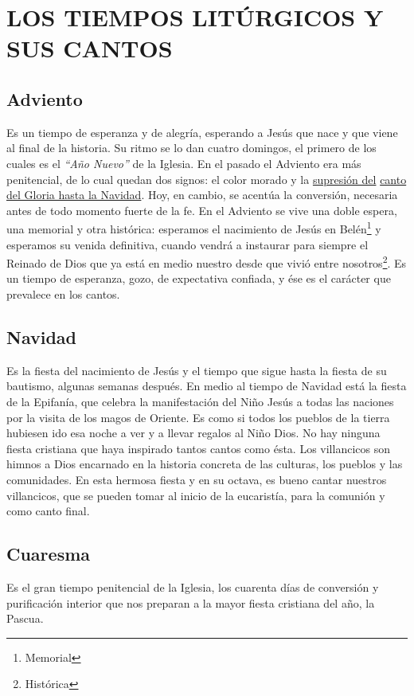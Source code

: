 \documentclass[letterpaper, 12pt]{book}
\begin{document}
    \chapter{LOS TIEMPOS LIT\'URGICOS Y SUS CANTOS}
    
    \section{Adviento}
    Es un tiempo de esperanza y de alegr\'ia, esperando a Jes\'us que nace y que viene al final de la historia. Su ritmo se lo dan cuatro domingos, el primero de los cuales es el \textit{``A\~no Nuevo''} de la Iglesia. En el pasado el Adviento era m\'as penitencial, de lo cual quedan dos signos: el color morado y la \underline{supresi\'on del} \underline{canto del Gloria hasta la Navidad}. Hoy, en cambio, se acent\'ua la conversi\'on, necesaria antes de todo momento fuerte de la fe. En el Adviento se vive una doble espera, una memorial y otra hist\'orica: esperamos el nacimiento de Jes\'us en Bel\'en\footnote{Memorial} y esperamos su venida definitiva, cuando vendr\'a a instaurar para siempre el Reinado de Dios que ya est\'a en medio nuestro desde que vivi\'o entre nosotros\footnote{Hist\'orica}. Es un tiempo de esperanza, gozo, de expectativa confiada, y \'ese es el car\'acter que prevalece en los cantos.
    
    \section{Navidad}
    Es la fiesta del nacimiento de Jes\'us y el tiempo que sigue hasta la fiesta de su bautismo, algunas semanas despu\'es. En medio al tiempo de Navidad est\'a la fiesta de la Epifan\'ia, que celebra la manifestaci\'on del Ni\~no Jes\'us a todas las naciones por la visita de los magos de Oriente. Es como si todos los pueblos de la tierra hubiesen ido esa noche a ver y a llevar regalos al Ni\~no Dios. No hay ninguna fiesta cristiana que haya inspirado tantos cantos como \'esta. Los villancicos son himnos a Dios encarnado en la historia concreta de las culturas, los pueblos y las comunidades. En esta hermosa fiesta y en su octava, es bueno cantar nuestros villancicos, que se pueden tomar al inicio de la eucarist\'ia, para la comuni\'on y como canto final.
    
    \section{Cuaresma}
    Es el gran tiempo penitencial de la Iglesia, los cuarenta d\'ias de conversi\'on y purificaci\'on interior que nos preparan a la mayor fiesta cristiana del a\~no, la Pascua.\newline
    
\end{document}
